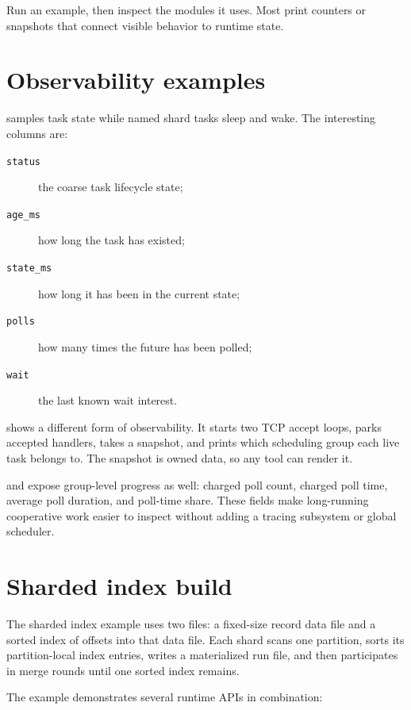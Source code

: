 Run an example, then inspect the modules it uses. Most print counters or
snapshots that connect visible behavior to runtime state.

\section{Observability examples}

 samples task state while named shard tasks
sleep and wake. The interesting columns are:

\begin{description}
    \item[\texttt{status}] the coarse task lifecycle state;
    \item[\texttt{age\_ms}] how long the task has existed;
    \item[\texttt{state\_ms}] how long it has been in the current state;
    \item[\texttt{polls}] how many times the future has been polled;
    \item[\texttt{wait}] the last known wait interest.
\end{description}

 shows a different form of
observability. It starts two TCP accept loops, parks accepted handlers, takes a
snapshot, and prints which scheduling group each live task belongs to. The
snapshot is owned data, so any tool can render it.

 and
 expose group-level progress as well:
charged poll count, charged poll time, average poll duration, and poll-time
share. These fields make long-running cooperative work easier to inspect
without adding a tracing subsystem or global scheduler.

\section{Sharded index build}

The sharded index example uses two files: a fixed-size record data file and a
sorted index of offsets into that data file. Each shard scans one partition,
sorts its partition-local index entries, writes a materialized run file, and
then participates in merge rounds until one sorted index remains.

The example demonstrates several runtime APIs in combination:

